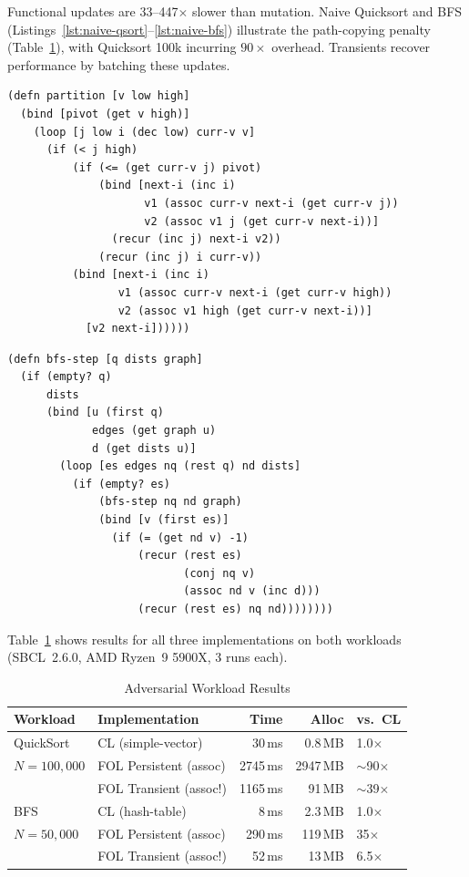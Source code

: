 \documentclass[sigconf,nonacm]{acmart}
\begin{document}
Functional updates are 33--447$\times$ slower than mutation. Naive Quicksort and BFS (Listings~\ref{lst:naive-qsort}--\ref{lst:naive-bfs}) illustrate the path-copying penalty (Table~\ref{tab:adversarial-bench}), with Quicksort 100k incurring $90\times$ overhead. Transients recover performance by batching these updates.

\begin{lstlisting}[caption={Naive Persistent Partition}, label={lst:naive-qsort}, float]
(defn partition [v low high]
  (bind [pivot (get v high)]
    (loop [j low i (dec low) curr-v v]
      (if (< j high)
          (if (<= (get curr-v j) pivot)
              (bind [next-i (inc i)
                     v1 (assoc curr-v next-i (get curr-v j))
                     v2 (assoc v1 j (get curr-v next-i))]
                (recur (inc j) next-i v2))
              (recur (inc j) i curr-v))
          (bind [next-i (inc i)
                 v1 (assoc curr-v next-i (get curr-v high))
                 v2 (assoc v1 high (get curr-v next-i))]
            [v2 next-i])))))
\end{lstlisting}

\begin{lstlisting}[caption={Naive Persistent BFS Step}, label={lst:naive-bfs}, float]
(defn bfs-step [q dists graph]
  (if (empty? q)
      dists
      (bind [u (first q)
             edges (get graph u)
             d (get dists u)]
        (loop [es edges nq (rest q) nd dists]
          (if (empty? es)
              (bfs-step nq nd graph)
              (bind [v (first es)]
                (if (= (get nd v) -1)
                    (recur (rest es)
                           (conj nq v)
                           (assoc nd v (inc d)))
                    (recur (rest es) nq nd))))))))
\end{lstlisting}

Table~\ref{tab:adversarial-bench} shows results for all three implementations on both workloads (SBCL~2.6.0, AMD Ryzen~9 5900X, 3 runs each).

\begin{table}[htbp]
\small
\caption{Adversarial Workload Results}
\label{tab:adversarial-bench}
\begin{tabular}{llrrl}
\toprule
\textbf{Workload} & \textbf{Implementation} & \textbf{Time} & \textbf{Alloc} & \textbf{vs.\ CL} \\
\midrule
QuickSort & CL (simple-vector)     &  30\,ms &    0.8\,MB & 1.0$\times$ \\
$N=100{,}000$   & FOL Persistent (assoc) & 2745\,ms & 2947\,MB & $\sim$90$\times$ \\
                & FOL Transient (assoc!) & 1165\,ms &   91\,MB & $\sim$39$\times$ \\
\midrule
BFS             & CL (hash-table)        &    8\,ms &   2.3\,MB & 1.0$\times$ \\
$N=50{,}000$    & FOL Persistent (assoc) &  290\,ms &  119\,MB & 35$\times$ \\
                & FOL Transient (assoc!) &   52\,ms &   13\,MB & 6.5$\times$ \\
\bottomrule
\end{tabular}
\end{table}
\end{document}
